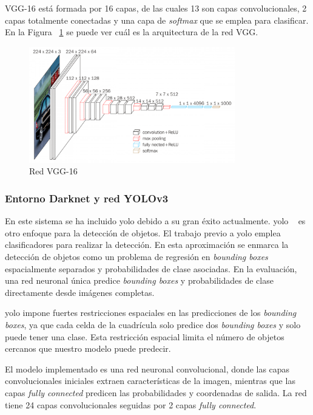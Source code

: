 VGG-16  está formada por 16 capas, de las cuales 13 son capas convolucionales, 2 capas totalmente conectadas y una capa de \textit{softmax} que se emplea para clasificar. En la Figura ~\ref{fig.vgg16} se puede ver cuál es la arquitectura de la red VGG.

 \begin{figure}[H] 
\begin{center}
	\includegraphics[width=0.8\textwidth]{figures/Diseno_global/vgg16.png}
   \caption{Red VGG-16}
	\label{fig.vgg16}
\end{center}
\end{figure}

\subsubsection{Entorno Darknet y red YOLOv3}

En este sistema se ha incluido \acrfull{yolo} debido a su gran éxito actualmente. \acrshort{yolo} ~\cite{yolo_article1} es otro enfoque para la detección de objetos. El trabajo previo a \acrshort{yolo} emplea clasificadores para realizar la detección. En esta aproximación se enmarca la detección de objetos como un problema de regresión en \textit{bounding boxes} espacialmente separados y probabilidades de clase asociadas. En la evaluación, una red neuronal única predice \textit{bounding boxes} y probabilidades de clase directamente desde imágenes completas. 

\acrshort{yolo} impone fuertes restricciones espaciales en las predicciones de los \textit{bounding boxes}, ya que cada celda de la cuadrícula solo predice dos \textit{bounding boxes} y solo puede tener una clase. Esta restricción espacial limita el número de objetos cercanos que nuestro modelo puede predecir. 

El modelo implementado es una red neuronal convolucional, donde las capas convolucionales iniciales extraen características de la imagen, mientras que las capas \textit{fully connected} predicen las probabilidades y coordenadas de salida. La red tiene 24 capas convolucionales seguidas por 2 capas \textit{fully connected}. 

